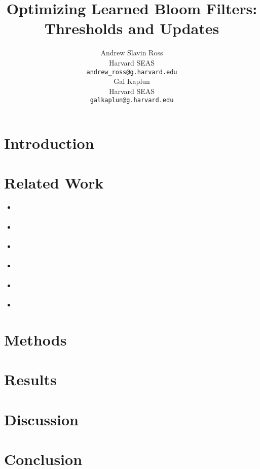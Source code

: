 \documentclass{article}
\title{Optimizing Learned Bloom Filters: Thresholds and Updates}
\author{%
  Andrew Slavin Ross \\
  Harvard SEAS \\
  \texttt{andrew\_ross@g.harvard.edu} \\
  \And
  Gal Kaplun \\
  Harvard SEAS \\
  \texttt{galkaplun@g.harvard.edu} \\
}
\begin{document}
\maketitle

\begin{abstract}
\end{abstract}

\section{Introduction}

\section{Related Work}

\begin{itemize}
    \item \cite{kraska2018case}
    \item \cite{rae2019meta}
    \item \cite{hadian2019considerations}
    \item \cite{mitzenmacher2018model}
    \item \cite{mitzenmacher2018model2}
    \item \cite{liangempirical}
\end{itemize}

\section{Methods}

\section{Results}

\section{Discussion}

\section{Conclusion}



\end{document}
